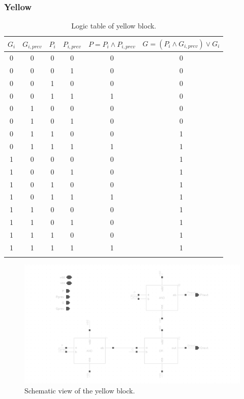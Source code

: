 \subsubsection{Yellow}

\begin{table}[H]
  \caption{Logic table of yellow block.}
  \centering
  \begin{tabular}{cccc|cc}
    \toprule
    $G_i$ & $G_{i,prev}$ & $P_i$ & $P_{i,prev}$ & $P=P_i \wedge P_{i,prev}$ & $G=(P_i \wedge G_{i,prev}) \vee G_i$ \\
    \midrule
    0 & 0 & 0 & 0 & 0 & 0 \\
    0 & 0 & 0 & 1 & 0 & 0 \\
    0 & 0 & 1 & 0 & 0 & 0 \\
    0 & 0 & 1 & 1 & 1 & 0 \\
    0 & 1 & 0 & 0 & 0 & 0 \\
    0 & 1 & 0 & 1 & 0 & 0 \\
    0 & 1 & 1 & 0 & 0 & 1 \\
    0 & 1 & 1 & 1 & 1 & 1 \\
    1 & 0 & 0 & 0 & 0 & 1 \\
    1 & 0 & 0 & 1 & 0 & 1 \\
    1 & 0 & 1 & 0 & 0 & 1 \\
    1 & 0 & 1 & 1 & 1 & 1 \\
    1 & 1 & 0 & 0 & 0 & 1 \\
    1 & 1 & 0 & 1 & 0 & 1 \\
    1 & 1 & 1 & 0 & 0 & 1 \\
    1 & 1 & 1 & 1 & 1 & 1 \\
    \bottomrule
    \label{tab:yellow}
  \end{tabular}
\end{table}

\begin{figure}[H]
  \centering
  \captionsetup{justification=centering}
  \includegraphics[clip,width=1.0\textwidth]{../figures/yellow}
  \caption{Schematic view of the yellow block.} \label{fig:yellow}
\end{figure}

